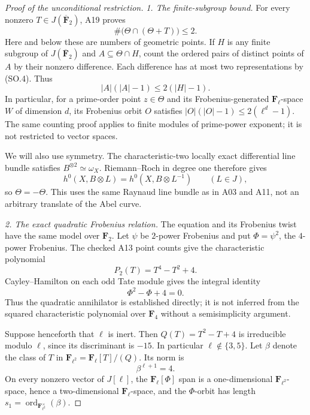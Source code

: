 \begin{proof}[Proof of the unconditional restriction]
\emph{1. The finite-subgroup bound.}
For every nonzero $T\in J(\overline{\mathbf F}_2)$, A19 proves
\[
                   \#\bigl(\Theta\cap(\Theta+T)\bigr)\le2.
                                                        \tag{SO.4}
\]
Here and below these are numbers of geometric points.  If $H$ is
any finite subgroup of $J(\overline{\mathbf F}_2)$ and
$A\subseteq\Theta\cap H$, count the ordered pairs of distinct
points of $A$ by their nonzero difference.  Each difference has
at most two representations by (SO.4).  Thus
\[
                         |A|(|A|-1)\le2(|H|-1).           \tag{SO.5}
\]
In particular, for a prime-order point $z\in\Theta$ and its
Frobenius-generated $\mathbf F_\ell$-space $W$ of dimension $d$,
its Frobenius orbit $O$ satisfies
$|O|(|O|-1)\le2(\ell^d-1)$.  The same counting proof applies
to finite modules of prime-power exponent; it is not restricted
to vector spaces.

We will also use symmetry.  The characteristic-two locally exact
differential line bundle satisfies $B^{\otimes2}\simeq\omega_X$.
Riemann--Roch in degree one therefore gives
\[
 h^0(X,B\otimes L)=h^0(X,B\otimes L^{-1})
                        \qquad(L\in J),
\]
so $\Theta=-\Theta$.  This uses the same Raynaud line bundle as
in A03 and A11, not an arbitrary translate of the Abel curve.

\emph{2. The exact quadratic Frobenius relation.}
The equation and its Frobenius twist have the same model over
$\mathbf F_2$.  Let $\psi$ be $2$-power Frobenius and put
$\Phi=\psi^2$, the $4$-power Frobenius.  The checked A13 point
counts give the characteristic polynomial
\[
                    P_2(T)=T^4-T^2+4.
\]
Cayley--Hamilton on each odd Tate module gives the integral
identity
\[
                      \Phi^2-\Phi+4=0.                    \tag{SO.6}
\]
Thus the quadratic annihilator is established directly; it is
not inferred from the squared characteristic polynomial over
$\mathbf F_4$ without a semisimplicity argument.

Suppose henceforth that $\ell$ is inert.  Then
$Q(T)=T^2-T+4$ is irreducible modulo $\ell$, since its
discriminant is $-15$.  In particular $\ell\notin\{3,5\}$.
Let $\beta$ denote the class of $T$ in
$\mathbf F_{\ell^2}=\mathbf F_\ell[T]/(Q)$.  Its norm is
\[
                         \beta^{\ell+1}=4.                \tag{SO.7}
\]
On every nonzero vector of $J[\ell]$, the $\mathbf F_\ell[\Phi]$
span is a one-dimensional $\mathbf F_{\ell^2}$-space, hence a
two-dimensional $\mathbf F_\ell$-space, and the $\Phi$-orbit has
length
$s_1=\operatorname{ord}_{\mathbf F_{\ell^2}^{\times}}(\beta)$.


\end{proof}
